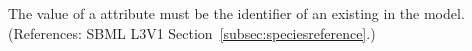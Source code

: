 The value of a \SpeciesReference {} attribute must be the
identifier of an existing \Species in the model.  (References: SBML
L3V1 Section~\ref{subsec:speciesreference}.)
